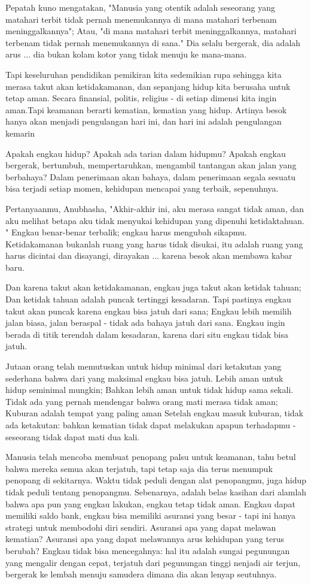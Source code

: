 Pepatah kuno mengatakan, "Manusia yang otentik adalah seseorang yang matahari terbit tidak pernah menemukannya di mana matahari terbenam meninggalkannya"; Atau, "di mana matahari terbit meninggalkannya, matahari terbenam tidak pernah menemukannya di sana." Dia selalu bergerak, dia adalah arus ... dia bukan kolam kotor yang tidak menuju ke mana-mana.

Tapi keseluruhan pendidikan pemikiran kita sedemikian rupa sehingga kita merasa takut akan ketidakamanan, dan sepanjang hidup kita berusaha untuk tetap aman. Secara finansial, politis, religius - di setiap dimensi kita ingin aman.Tapi keamanan berarti kematian, kematian yang hidup. Artinya besok hanya akan menjadi pengulangan hari ini, dan hari ini adalah pengulangan kemarin

Apakah engkau hidup? Apakah ada tarian dalam hidupmu? Apakah engkau bergerak, bertumbuh, mempertaruhkan, mengambil tantangan akan jalan yang berbahaya? Dalam penerimaan akan bahaya, dalam penerimaan segala sesuatu bisa terjadi setiap momen, kehidupan mencapai yang terbaik, sepenuhnya.

Pertanyaanmu, Anubhasha, "Akhir-akhir ini, aku merasa sangat tidak aman, dan aku melihat betapa aku tidak menyukai kehidupan yang dipenuhi ketidaktahuan. " Engkau benar-benar terbalik; engkau harus mengubah sikapmu. Ketidakamanan bukanlah ruang yang harus tidak disukai, itu adalah ruang yang harus dicintai dan disayangi, dirayakan ... karena besok akan membawa kabar baru.

Dan karena takut akan ketidakamanan, engkau juga takut akan ketidak tahuan; Dan ketidak tahuan adalah puncak tertinggi kesadaran. Tapi pastinya engkau takut akan puncak karena engkau bisa jatuh dari sana; Engkau lebih memilih jalan biasa, jalan beraspal - tidak ada bahaya jatuh dari sana. Engkau ingin berada di titik terendah dalam kesadaran, karena dari situ engkau tidak bisa jatuh.

Jutaan orang telah memutuskan untuk hidup minimal dari ketakutan yang sederhana bahwa dari yang maksimal engkau bisa jatuh. Lebih aman untuk hidup seminimal mungkin; Bahkan lebih aman untuk tidak hidup sama sekali. Tidak ada yang pernah mendengar bahwa orang mati merasa tidak aman; Kuburan adalah tempat yang paling aman Setelah engkau masuk kuburan, tidak ada ketakutan: bahkan kematian tidak dapat melakukan apapun terhadapmu - seseorang tidak dapat mati dua kali.

Manusia telah mencoba membuat penopang palsu untuk keamanan, tahu betul bahwa mereka semua akan terjatuh, tapi tetap saja dia terus menumpuk penopang di sekitarnya. Waktu tidak peduli dengan alat penopangmu, juga hidup tidak peduli tentang penopangmu. Sebenarnya, adalah belas kasihan dari alamlah bahwa apa pun yang engkau lakukan, engkau tetap tidak aman. Engkau dapat memiliki saldo bank, engkau bisa memiliki asuransi yang besar - tapi ini hanya strategi untuk membodohi diri sendiri. Asuransi apa yang dapat melawan kematian? Asuransi apa yang dapat melawannya arus kehidupan yang terus berubah? Engkau tidak bisa mencegahnya: hal itu adalah sungai pegunungan yang mengalir dengan cepat, terjatuh dari pegunungan tinggi nenjadi air terjun, bergerak ke lembah menuju samudera dimana dia akan lenyap seutuhnya.


